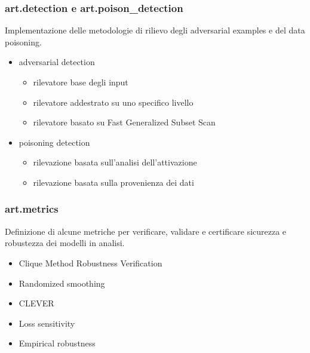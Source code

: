 \subsubsection{art.detection e art.poison\_detection}
Implementazione delle metodologie di rilievo degli adversarial examples e del data poisoning. 

\begin{itemize}
    \item adversarial detection \begin{itemize}
        \item rilevatore base degli input
        \item rilevatore addestrato su uno specifico livello
        \item rilevatore basato su Fast Generalized Subset Scan
    \end{itemize}
    \item poisoning detection \begin{itemize}
        \item rilevazione basata sull'analisi dell'attivazione
        \item rilevazione basata sulla provenienza dei dati
    \end{itemize}
\end{itemize}
\subsubsection{art.metrics}
Definizione di alcune metriche per verificare, validare e certificare sicurezza e robustezza dei modelli in analisi. 

\begin{itemize}
    \item Clique Method Robustness Verification
    \item Randomized smoothing
    \item CLEVER
    \item Loss sensitivity
    \item Empirical robustness
\end{itemize}
